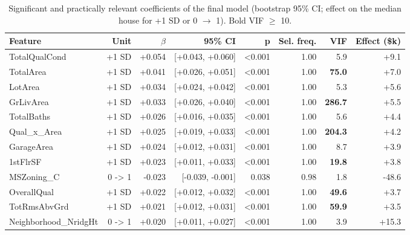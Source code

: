 \begin{table}[t]
\centering
\small
\begin{tabular}{lrrrrrrr}
\toprule
Feature & Unit & $\beta$ & 95\% CI & p & Sel. freq. & VIF & Effect (\$k) \\
\midrule
TotalQualCond & +1 SD & +0.054 & [+0.043, +0.060] & <0.001 & 1.00 & 5.9 & +9.1 \\
TotalArea & +1 SD & +0.041 & [+0.026, +0.051] & <0.001 & 1.00 & \textbf{75.0} & +7.0 \\
LotArea & +1 SD & +0.034 & [+0.024, +0.042] & <0.001 & 1.00 & 5.3 & +5.6 \\
GrLivArea & +1 SD & +0.033 & [+0.026, +0.040] & <0.001 & 1.00 & \textbf{286.7} & +5.5 \\
TotalBaths & +1 SD & +0.026 & [+0.016, +0.035] & <0.001 & 1.00 & 5.6 & +4.4 \\
Qual\_x\_Area & +1 SD & +0.025 & [+0.019, +0.033] & <0.001 & 1.00 & \textbf{204.3} & +4.2 \\
GarageArea & +1 SD & +0.024 & [+0.012, +0.031] & <0.001 & 1.00 & 8.7 & +3.9 \\
1stFlrSF & +1 SD & +0.023 & [+0.011, +0.033] & <0.001 & 1.00 & \textbf{19.8} & +3.8 \\
MSZoning\_C & 0 -> 1 & -0.023 & [-0.039, -0.001] & 0.038 & 0.98 & 1.8 & -48.6 \\
OverallQual & +1 SD & +0.022 & [+0.012, +0.032] & <0.001 & 1.00 & \textbf{49.6} & +3.7 \\
TotRmsAbvGrd & +1 SD & +0.021 & [+0.012, +0.031] & <0.001 & 1.00 & \textbf{59.9} & +3.5 \\
Neighborhood\_NridgHt & 0 -> 1 & +0.020 & [+0.011, +0.027] & <0.001 & 1.00 & 3.9 & +15.3 \\
\bottomrule
\end{tabular}
\caption{Significant and practically relevant coefficients of the final model (bootstrap 95\% CI; effect on the median house for +1 SD or 0 $\rightarrow$ 1). Bold VIF $\geq$ 10.}
\label{tab:coefficients}
\end{table}

